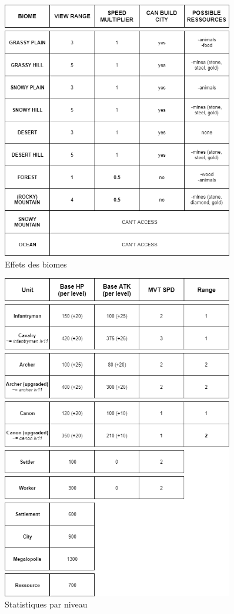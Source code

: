 \documentclass[12pt]{report}
\begin{document}
\begin{figure}[H]
    \centering
    \includegraphics[width=0.9\textwidth]{biomes_effects}
    \caption{Effets des biomes}
\end{figure}
\begin{figure}[H]
    \centering
    \includegraphics[width=0.9\textwidth]{units_stats}
    \caption{Statistiques par niveau}
\end{figure}
\end{document}

